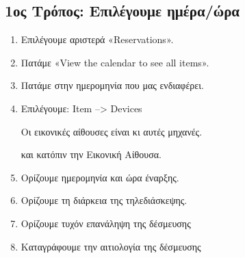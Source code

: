 \documentclass[letterpaper,10pt,greek]{sphinxhowto}
\begin{document}
\subsection{1ος Τρόπος: Επιλέγουμε ημέρα/ώρα}
\label{\detokenize{HowToZoom:id1}}\begin{enumerate}
%
\item {} 
\sphinxAtStartPar
Επιλέγουμε αριστερά «Reservations».

\item {} 
\sphinxAtStartPar
Πατάμε «View the calendar to see all items».

\item {} 
\sphinxAtStartPar
Πατάμε στην ημερομηνία που μας ενδιαφέρει.

\item {} 
\sphinxAtStartPar
Επιλέγουμε: Item –> Devices %
\begin{footnote}[1]\sphinxAtStartFootnote
Οι εικονικές αίθουσες είναι κι αυτές μηχανές.
%
\end{footnote}  και κατόπιν την Εικονική Αίθουσα.

\item {} 
\sphinxAtStartPar
Ορίζουμε ημερομηνία και ώρα έναρξης.

\item {} 
\sphinxAtStartPar
Ορίζουμε τη διάρκεια της τηλεδιάσκεψης.

\item {} 
\sphinxAtStartPar
Ορίζουμε τυχόν επανάληψη της δέσμευσης

\item {} 
\sphinxAtStartPar
Καταγράφουμε την αιτιολογία της δέσμευσης

\end{enumerate}
\end{document}
